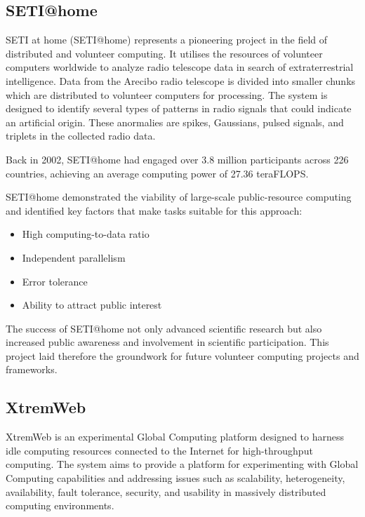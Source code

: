 \subsection{SETI@home}
\label{subsec:background:related_work:seti}
\ac{SETI} at home (\ac{SETI}@home) represents a pioneering project in the field of distributed and volunteer computing. It utilises the resources of volunteer computers worldwide to analyze radio telescope data in search of extraterrestrial intelligence. Data from the Arecibo radio telescope is divided into smaller chunks which are distributed to volunteer computers for processing. The system is designed to identify several types of patterns in radio signals that could indicate an artificial origin. These anormalies are spikes, Gaussians, pulsed signals, and triplets in the collected radio data. \cite{relatedwork:seti}

Back in 2002, \ac{SETI}@home had engaged over 3.8 million participants across 226 countries, achieving an average computing power of 27.36 teraFLOPS. \cite{relatedwork:seti}

\ac{SETI}@home demonstrated the viability of large-scale public-resource computing and identified key factors that make tasks suitable for this approach:
\begin{itemize}
  \item High computing-to-data ratio
  \item Independent parallelism
  \item Error tolerance
  \item Ability to attract public interest
\end{itemize}
The success of \ac{SETI}@home not only advanced scientific research but also increased public awareness and involvement in scientific participation. This project laid therefore the groundwork for future volunteer computing projects and frameworks. \cite{relatedwork:seti}

\subsection{XtremWeb}
\label{subsec:background:related_work:xtremweb}
XtremWeb is an experimental Global Computing platform designed to harness idle computing resources connected to the Internet for high-throughput computing. The system aims to provide a platform for experimenting with Global Computing capabilities and addressing issues such as scalability, heterogeneity, availability, fault tolerance, security, and usability in massively distributed computing environments. \cite{relatedwork:xtremweb}

